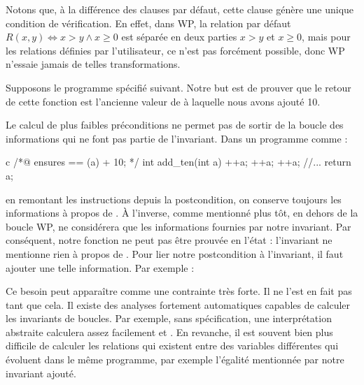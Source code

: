 Notons que, à la différence des clauses  par défaut,
cette clause génère une unique condition de vérification. En effet, dans WP,
la relation par défaut $R(x,y) \Leftrightarrow x > y \wedge x \geq 0$ est
séparée en deux parties $x > y$ et $x \geq 0$, mais pour les relations définies
par l'utilisateur, ce n'est pas forcément possible, donc WP n'essaie jamais de
telles transformations.




Supposons le programme spécifié suivant. Notre but est de prouver que le retour
de cette fonction est l'ancienne valeur de  à laquelle nous avons ajouté 10.






Le calcul de plus faibles préconditions ne permet pas de sortir de la boucle des
informations qui ne font pas partie de l'invariant. Dans un programme comme :
\begin{CodeBlock}{c}
/*@
    ensures \result == \old(a) + 10;
*/
int add_ten(int a){
    ++a;
    ++a;
    ++a;
    //...
    return a;
}
\end{CodeBlock}
en remontant les instructions depuis la postcondition, on conserve toujours les
informations à propos de . À l'inverse, comme mentionné plus tôt, en dehors
de la boucle WP, ne considérera que les informations fournies par notre
invariant. Par conséquent, notre fonction  ne peut pas être prouvée
en l'état : l'invariant ne mentionne rien à propos de . Pour lier notre
postcondition à l'invariant, il faut ajouter une telle information. Par
exemple :






\begin{Information}
Ce besoin peut apparaître comme une contrainte très forte. Il ne l'est en fait pas
tant que cela. Il existe des analyses fortement automatiques capables de
calculer les invariants de boucles. Par exemple, sans spécification, une
interprétation abstraite calculera assez facilement  et
. En revanche, il est souvent bien plus difficile
de calculer les relations qui existent entre des variables différentes qui
évoluent dans le même programme, par exemple l'égalité mentionnée par notre
invariant ajouté.
\end{Information}


